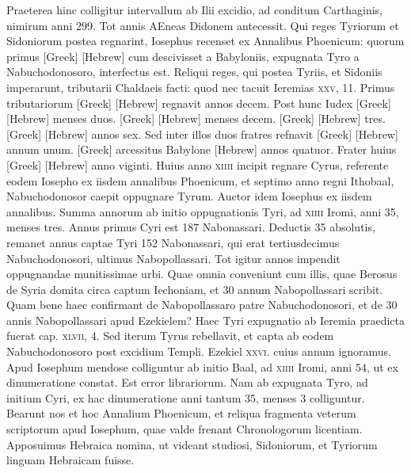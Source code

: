 Praeterea hinc colligitur intervallum
ab Ilii excidio, ad conditum Carthaginis, nimirum anni 299.
Tot annis AEneas Didonem antecessit.
Qui reges Tyriorum et Sidoniorum
postea regnarint, Iosephus recenset ex Annalibus Phoenicum:
quorum primus \textgreek{[Greek]} \texthebrew{[Hebrew]}
 cum descivisset a Babyloniis,
expugnata Tyro a Nabuchodonosoro, interfectus est.
Reliqui reges, qui postea Tyriis, et Sidoniis imperarunt, tributarii
Chaldaeis facti: quod nec tacuit Ieremias \textsc{xxv}, 11.
Primus
tributariorum \textgreek{[Greek]} \texthebrew{[Hebrew]} regnavit annos decem.
Post hunc Iudex
\textgreek{[Greek]} \texthebrew{[Hebrew]} menses duos.
\textgreek{[Greek]} \texthebrew{[Hebrew]} menses decem.
\textgreek{[Greek]} \texthebrew{[Hebrew]} tres.
\textgreek{[Greek]} \texthebrew{[Hebrew]}
annos sex.
Sed inter illos duos fratres refnavit
 \textgreek{[Greek]} \texthebrew{[Hebrew]}
annum unum.
\textgreek{[Greek]} arcessitus Babylone
 \texthebrew{[Hebrew]} annos quatuor.
Frater huius \textgreek{[Greek]} \texthebrew{[Hebrew]} anno viginti.
Huius anno \textsc{xiiii}
incipit regnare Cyrus, referente eodem Iosepho ex iisdem annalibus
Phoenicum, et septimo anno regni Ithobaal, Nabuchodonosor
caepit oppugnare Tyrum.
Auctor idem Iosephus ex iisdem
annalibus.
Summa annorum ab initio oppugnationis Tyri, ad
\textsc{xiiii} Iromi, anni 35, menses tres.
Annus primus Cyri est 187 Nabonassari.
Deductis 35 absolutis, remanet annus captae Tyri 152
Nabonassari, qui erat tertiusdecimus Nabuchodonosori, ultimus
Nabopollassari.
Tot igitur annos impendit oppugnandae munitissimae
urbi.
Quae omnia conveniunt cum illis, quae Berosus de Syria
domita circa captum Iechoniam, et 30 annum Nabopollassari scribit.
Quam bene haec confirmant de Nabopollassaro patre Nabuchodonosori,
et de 30 annis Nabopollassari apud Ezekielem?
Haec Tyri expugnatio ab Ieremia praedicta fuerat cap. \textsc{xlvii}, 4.
Sed iterum
Tyrus rebellavit, et capta ab eodem Nabuchodonosoro post
excidium Templi.
Ezekiel \textsc{xxvi}. cuius annum ignoramus.
Apud
Iosephum mendose colliguntur ab initio Baal, ad \textsc{xiiii} Iromi, anni
54, ut ex dinumeratione constat.
Est error librariorum.
Nam ab expugnata
Tyro, ad initium Cyri, ex hac dinumeratione anni tantum
35, menses 3 colliguntur.
Bearunt nos et hoc Annalium Phoenicum,
et reliqua fragmenta veterum scriptorum apud Iosephum, quae valde
frenant Chronologorum licentiam.
{}
Apposuimus Hebraica
nomina, ut videant studiosi, Sidoniorum, et Tyriorum linguam
Hebraicam fuisse.

